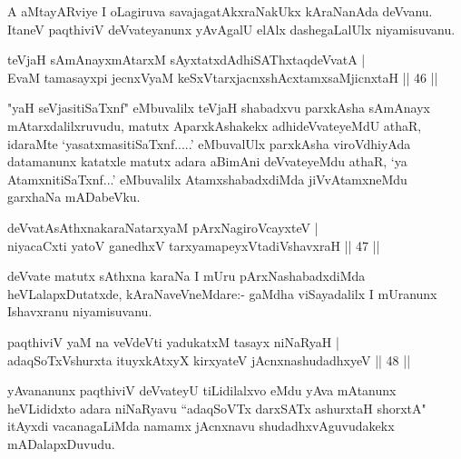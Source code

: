 \begin{artha}
A aMtayARviye I oLagiruva savajagatAkxraNakUkx kAraNanAda deVvanu. ItaneV paqthiviV deVvateyanunx yAvAgalU elAlx dashegaLalUlx niyamisuvanu.
\end{artha}


\begin{shl}
teVjaH sAmAnayxmAtarxM sAyxtatxdAdhiSAThxtaqdeVvatA |\\
EvaM tamasayxpi jecnxVyaM keSxVtarxjacnxshAcx\s \s tamxsaMjicnxtaH \hfill || 46 ||
\end{shl}

\begin{artha}
"yaH seVjasitiSaTxnf" eMbuvalilx teVjaH shabadxvu parxkAsha sAmAnayx mAtarxdalilxruvudu, matutx AparxkAshakekx adhideVvateyeMdU athaR, idaraMte `yasatxmasitiSaTxnf.....' eMbuvalUlx parxkAsha viroVdhiyAda datamanunx katatxle matutx adara aBimAni \-deVvateyeMdu athaR, `ya AtamxnitiSaTxnf...' eMbuvalilx AtamxshabadxdiMda jiVvAtamx\-neMdu garxhaNa mADabeVku.
\end{artha}%


\begin{shl}
deVvatAsAthxnakaraNatarxyaM pArxNagiroVcayxteV |\\
niyacaCxti yatoV ganedhxV tarxyamapeyxVtadiVshavxraH \hfill || 47 ||
\end{shl}

\begin{artha}
deVvate matutx sAthxna karaNa I mUru pArxNashabadxdiMda heVLalapxDutatxde, kAraNaveVneMdare:- gaMdha viSayadalilx I mUranunx Ishavxranu niyamisuvanu.
\end{artha}


\begin{shl}
paqthiviV yaM na veVdeVti yadukatxM tasayx niNaRyaH |\\
adaqSoTxV\s shurxta ituyxkAtxyX kirxyateV jAcnxnashudadhxyeV \hfill || 48 ||
\end{shl}

\begin{artha}
yAvananunx paqthiviV deVvateyU tiLidilalxvo eMdu yAva mAtanunx heVLididxto adara niNaRyavu ``adaqSoVTx darxSATx ashurxtaH shorxtA" itAyxdi vacanagaLiMda namamx jAcnxnavu shudadhxvAguvudakekx mADalapxDuvudu.
\end{artha}

